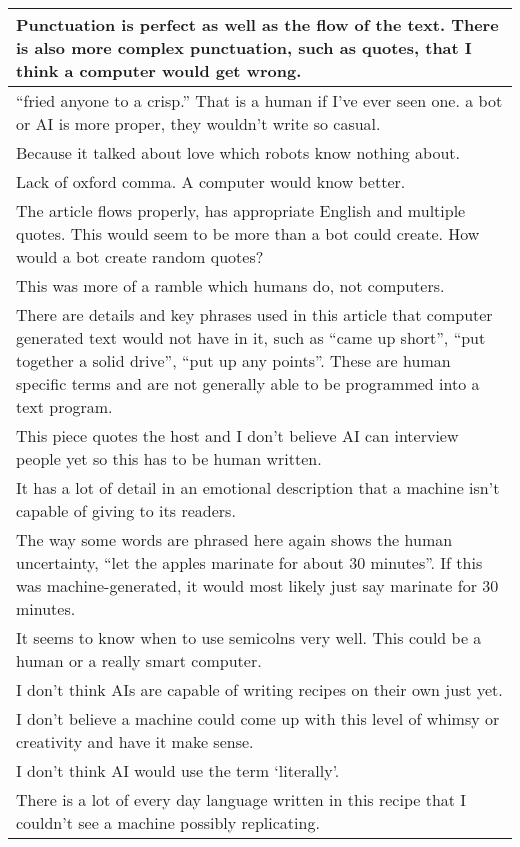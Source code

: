 \begin{table*}[t!]
\centering
\small
\begin{tabular}{p{\linewidth}}
\toprule
Punctuation is perfect as well as the flow of the text. There is also more complex punctuation, such as quotes, that I think a computer would get wrong. \\
\midrule
``fried anyone to a crisp.'' That is a human if I've ever seen one. a bot or AI is more proper, they wouldn't write so casual. \\
\midrule
Because it talked about love which robots know nothing about. \\
\midrule
Lack of oxford comma. A computer would know better. \\
\midrule
The article flows properly, has appropriate English and multiple quotes. This would seem to be more than a bot could create. How would a bot create random quotes? \\
\midrule
This was more of a ramble which humans do, not computers. \\
\midrule
There are details and key phrases used in this article that computer generated text would not have in it, such as ``came up short'', ``put together a solid drive'', ``put up any points''. These are human specific terms and are not generally able to be programmed into a text program. \\
\midrule
This piece quotes the host and I don't believe AI can interview people yet so this has to be human written. \\
\midrule
It has a lot of detail in an emotional description that a machine isn't capable of giving to its readers. \\
\midrule
The way some words are phrased here again shows the human uncertainty, ``let the apples marinate for about 30 minutes''. If this was machine-generated, it would most likely just say marinate for 30 minutes. \\
\midrule
It seems to know when to use semicolns very well. This could be a human or a really smart computer. \\
\midrule
I don’t think AIs are capable of writing recipes on their own just yet. \\
\midrule
I don't believe a machine could come up with this level of whimsy or creativity and have it make sense. \\
\midrule
I don't think AI would use the term `literally'. \\
\midrule
There is a lot of every day language written in this recipe that I couldn't see a machine possibly replicating. \\

\end{tabular}
\end{table*}
